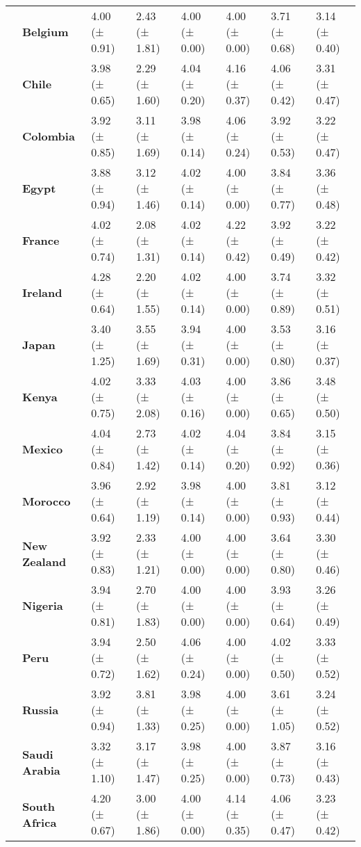 \begin{tabular}{llllllll}
\textbf{} & \textbf{Belgium} & 4.00 (± 0.91) & 2.43 (± 1.81) & 4.00 (± 0.00) & 4.00 (± 0.00) & 3.71 (± 0.68) & 3.14 (± 0.40) \\
\textbf{} & \textbf{Chile} & 3.98 (± 0.65) & 2.29 (± 1.60) & 4.04 (± 0.20) & 4.16 (± 0.37) & 4.06 (± 0.42) & 3.31 (± 0.47) \\
\textbf{} & \textbf{Colombia} & 3.92 (± 0.85) & 3.11 (± 1.69) & 3.98 (± 0.14) & 4.06 (± 0.24) & 3.92 (± 0.53) & 3.22 (± 0.47) \\
\textbf{} & \textbf{Egypt} & 3.88 (± 0.94) & 3.12 (± 1.46) & 4.02 (± 0.14) & 4.00 (± 0.00) & 3.84 (± 0.77) & 3.36 (± 0.48) \\
\textbf{} & \textbf{France} & 4.02 (± 0.74) & 2.08 (± 1.31) & 4.02 (± 0.14) & 4.22 (± 0.42) & 3.92 (± 0.49) & 3.22 (± 0.42) \\
\textbf{} & \textbf{Ireland} & 4.28 (± 0.64) & 2.20 (± 1.55) & 4.02 (± 0.14) & 4.00 (± 0.00) & 3.74 (± 0.89) & 3.32 (± 0.51) \\
\textbf{} & \textbf{Japan} & 3.40 (± 1.25) & 3.55 (± 1.69) & 3.94 (± 0.31) & 4.00 (± 0.00) & 3.53 (± 0.80) & 3.16 (± 0.37) \\
\textbf{} & \textbf{Kenya} & 4.02 (± 0.75) & 3.33 (± 2.08) & 4.03 (± 0.16) & 4.00 (± 0.00) & 3.86 (± 0.65) & 3.48 (± 0.50) \\
\textbf{} & \textbf{Mexico} & 4.04 (± 0.84) & 2.73 (± 1.42) & 4.02 (± 0.14) & 4.04 (± 0.20) & 3.84 (± 0.92) & 3.15 (± 0.36) \\
\textbf{} & \textbf{Morocco} & 3.96 (± 0.64) & 2.92 (± 1.19) & 3.98 (± 0.14) & 4.00 (± 0.00) & 3.81 (± 0.93) & 3.12 (± 0.44) \\
\textbf{} & \textbf{New Zealand} & 3.92 (± 0.83) & 2.33 (± 1.21) & 4.00 (± 0.00) & 4.00 (± 0.00) & 3.64 (± 0.80) & 3.30 (± 0.46) \\
\textbf{} & \textbf{Nigeria} & 3.94 (± 0.81) & 2.70 (± 1.83) & 4.00 (± 0.00) & 4.00 (± 0.00) & 3.93 (± 0.64) & 3.26 (± 0.49) \\
\textbf{} & \textbf{Peru} & 3.94 (± 0.72) & 2.50 (± 1.62) & 4.06 (± 0.24) & 4.00 (± 0.00) & 4.02 (± 0.50) & 3.33 (± 0.52) \\
\textbf{} & \textbf{Russia} & 3.92 (± 0.94) & 3.81 (± 1.33) & 3.98 (± 0.25) & 4.00 (± 0.00) & 3.61 (± 1.05) & 3.24 (± 0.52) \\
\textbf{} & \textbf{Saudi Arabia} & 3.32 (± 1.10) & 3.17 (± 1.47) & 3.98 (± 0.25) & 4.00 (± 0.00) & 3.87 (± 0.73) & 3.16 (± 0.43) \\
\textbf{} & \textbf{South Africa} & 4.20 (± 0.67) & 3.00 (± 1.86) & 4.00 (± 0.00) & 4.14 (± 0.35) & 4.06 (± 0.47) & 3.23 (± 0.42) \\

\end{tabular}
